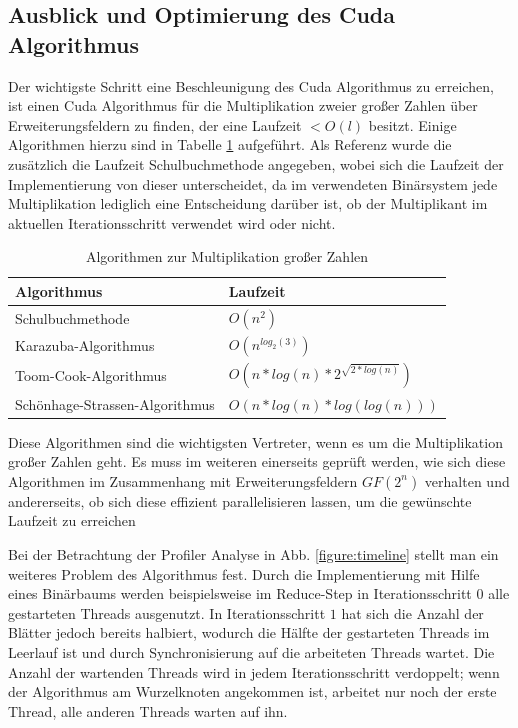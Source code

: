 {\subsection{Ausblick und Optimierung des Cuda Algorithmus}
Der wichtigste Schritt eine Beschleunigung des Cuda Algorithmus zu erreichen, ist einen Cuda Algorithmus für die Multiplikation zweier großer Zahlen über Erweiterungsfeldern zu finden, der eine Laufzeit $<O(l)$ besitzt. Einige Algorithmen hierzu sind in Tabelle \ref{table:bnmult} aufgeführt. Als Referenz wurde die zusätzlich die Laufzeit Schulbuchmethode angegeben, wobei sich die Laufzeit der Implementierung von dieser unterscheidet, da im verwendeten Binärsystem jede Multiplikation lediglich eine Entscheidung darüber ist, ob der Multiplikant im aktuellen Iterationsschritt verwendet wird oder nicht.

\begin{table}[b]
\centering
\begin{tabular}{ll}
\toprule
Algorithmus & Laufzeit \\
\midrule
Schulbuchmethode & $O(n^2)$ \\
Karazuba-Algorithmus & $O(n^{log_2(3)})$ \\
Toom-Cook-Algorithmus & $O(n*log(n)*2^{\sqrt{2*log(n)}})$ \\
Schönhage-Strassen-Algorithmus & $O(n*log(n)*log(log(n)))$ \\
\bottomrule
\end{tabular}
\caption{Algorithmen zur Multiplikation großer Zahlen}
\label{table:bnmult}
\end{table}

Diese Algorithmen sind die wichtigsten Vertreter, wenn es um die Multiplikation großer Zahlen geht. Es muss im weiteren einerseits geprüft werden, wie sich diese Algorithmen im Zusammenhang mit Erweiterungsfeldern $GF(2^n)$ verhalten und andererseits, ob sich diese effizient parallelisieren lassen, um die gewünschte Laufzeit zu erreichen\newline

Bei der Betrachtung der Profiler Analyse in Abb. \ref{figure:timeline} stellt man ein weiteres Problem des Algorithmus fest. Durch die Implementierung mit Hilfe eines Binärbaums werden beispielsweise im Reduce-Step in Iterationsschritt $0$ alle gestarteten Threads ausgenutzt. In Iterationsschritt $1$ hat sich die Anzahl der Blätter jedoch bereits halbiert, wodurch die Hälfte der gestarteten Threads im Leerlauf ist und durch Synchronisierung auf die arbeiteten Threads wartet. Die Anzahl der wartenden Threads wird in jedem Iterationsschritt verdoppelt; wenn der Algorithmus am Wurzelknoten angekommen ist, arbeitet nur noch der erste Thread, alle anderen Threads warten auf ihn.

}
